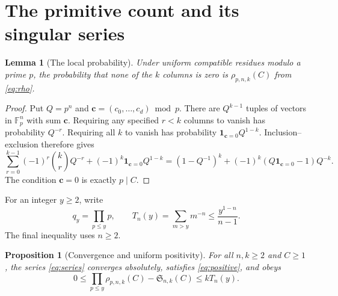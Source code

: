 \documentclass[11pt]{amsart}
\newcommand{\F}{\mathbb F}
\newcommand{\Sseries}{\mathfrak S}
\newcommand{\ind}{\mathbf 1}
\newtheorem{proposition}[theorem]{Proposition}
\newtheorem{lemma}[theorem]{Lemma}
\theoremstyle{definition}
\theoremstyle{remark}
\begin{document}
\section{The primitive count and its singular series}\label{sec:primitive}

\begin{lemma}[The local probability]\label{lem:local}
Under uniform compatible residues modulo a prime $p$, the probability
that none of the $k$ columns is zero is $\rho_{p,n,k}(C)$ from
\eqref{eq:rho}.
\end{lemma}

\begin{proof}
Put $Q=p^n$ and $\mathbf c=(c_0,\ldots,c_d)\bmod p$. There are
$Q^{k-1}$ tuples of vectors in $\F_p^n$ with sum $\mathbf c$.
Requiring any specified $r<k$ columns to vanish has probability
$Q^{-r}$. Requiring all $k$ to vanish has probability
$\ind_{\mathbf c=0}Q^{1-k}$. Inclusion--exclusion therefore gives
\[
\sum_{r=0}^{k-1}(-1)^r\binom kr Q^{-r}
+(-1)^k\ind_{\mathbf c=0}Q^{1-k}
=(1-Q^{-1})^k+(-1)^k(Q\ind_{\mathbf c=0}-1)Q^{-k}.
\]
The condition $\mathbf c=0$ is exactly $p\mid C$.
\end{proof}

For an integer $y\ge2$, write
\begin{equation}\label{eq:cutoffs}
q_y=\prod_{p\le y}p,
\qquad
T_n(y)=\sum_{m>y}m^{-n}
\le\frac{y^{1-n}}{n-1}.
\end{equation}
The final inequality uses $n\ge2$.

\begin{proposition}[Convergence and uniform positivity]\label{prop:product}
For all $n,k\ge2$ and $C\ge1$, the series \eqref{eq:series} converges
absolutely, satisfies \eqref{eq:positive}, and obeys
\begin{equation}\label{eq:producttail}
0\le\prod_{p\le y}\rho_{p,n,k}(C)-\Sseries_{n,k}(C)
\le kT_n(y).
\end{equation}
\end{proposition}
\end{document}
